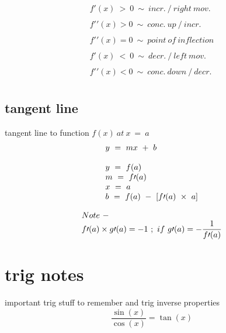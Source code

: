 \documentclass{article}
\begin{document}
\begin{multicols}{3}
\[\begin{array}{l}
        f\prime ( x) \  >\ 0\ \sim \ incr.\ /\ right\ mov.\\
        \\
        f\prime \prime ( x)  >0\ \sim \ conc.\ up\ /\ incr.\\\
        \\
        f\prime \prime ( x) =0\ \sim \ point\ of\ inflection\\
        \\
        f\prime ( x) \ < \ 0\ \sim \ decr.\ /\ left\ mov.\\\
        \\
        f\prime \prime ( x) < 0\ \sim \ conc.\ down\ /\ decr.\\
    \end{array}
    \]
\end{multicols}




\setlength{\columnsep}{0.1cm} 
\begin{multicols}{2}
    \section{tangent line}
    tangent line to function \(f( x) \ at\ x\ =\ a\)
    \[
        \begin{array}{>{\displaystyle}l}  
        y\ =\ mx\ +\ b\ \\
        \\
        y\ =\ f( a) \ \\

        m\ =\ f\prime ( a) \ \\

        x\ =\ a\ \\

        b\ =\ f( a) \ -\ [ f\prime ( a) \ \times \ a]
    \end{array}
    \]

    \columnbreak
    \[
    \begin{array}{>{\displaystyle}l}  
        Note\ -\ \\
        f\prime ( a) \times g\prime ( a) =-1\ ;\ if\ g\prime ( a) =-\frac{1}{f\prime ( a)}
    \end{array}
    \]
\end{multicols}


\section{trig notes}
important trig stuff to remember and trig inverse properties    
\[\frac{\sin( x)}{\cos( x)} = \tan( x)\]
\end{document}
